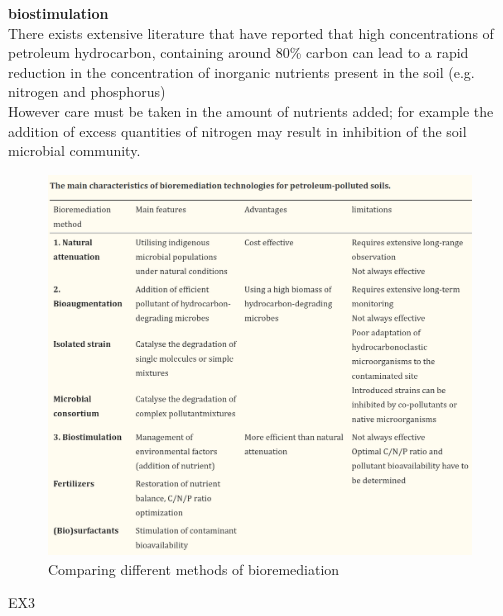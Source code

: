 \documentclass[twocolumn]{article} %
\begin{document}
\textbf{biostimulation}\\
There exists extensive literature that have reported that high concentrations of petroleum hydrocarbon, containing around 80\% carbon can lead to a rapid reduction in the concentration of inorganic nutrients present in the soil (e.g. nitrogen and phosphorus)\cite{7.2}\\
However care must be taken in the amount of nutrients added; for example the addition of excess quantities of nitrogen may result in inhibition of the soil microbial community.




\begin{figure}[H]
    \centering
    \includegraphics[width=\columnwidth]{7.png}
    \caption{Comparing different methods of bioremediation}
\end{figure}


EX3\cite{ex3}








 

\end{document}

